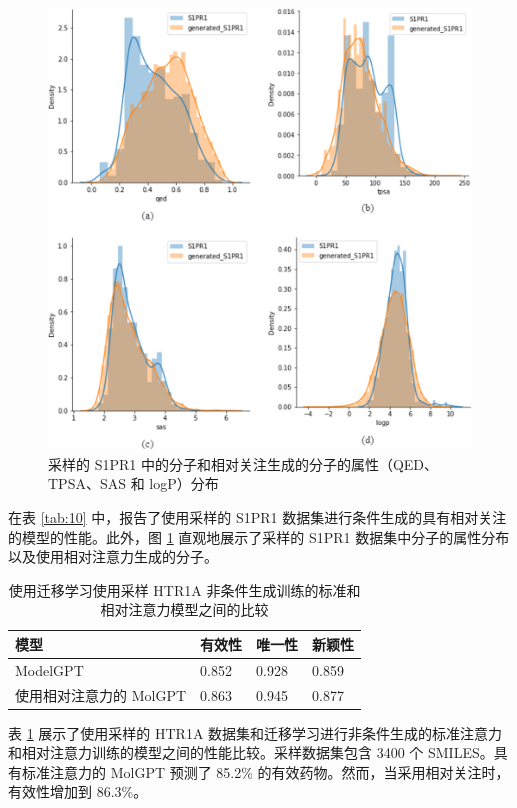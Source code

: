 \begin{translation}
\begin{figure}[H]
  \centering
  \includegraphics[width=\linewidth]{figures/7.png}
  \caption{采样的 S1PR1 中的分子和相对关注生成的分子的属性（QED、TPSA、SAS 和 logP）分布}
  \label{fig:7}
\end{figure}

在表 \ref{tab:10} 中，报告了使用采样的 S1PR1 数据集进行条件生成的具有相对关注的模型的性能。此外，图 \ref{fig:7} 直观地展示了采样的 S1PR1 数据集中分子的属性分布以及使用相对注意力生成的分子。

\begin{table}[H]
  \centering
  \caption{使用迁移学习使用采样 HTR1A 非条件生成训练的标准和相对注意力模型之间的比较}
  \label{tab:11}
  \begin{tabular}{llll}
    \hline 模型       & 有效性   & 唯一性   & 新颖性   \\
    \hline ModelGPT & 0.852 & 0.928 & 0.859 \\
    使用相对注意力的 MolGPT & 0.863 & 0.945 & 0.877 \\
    \hline
  \end{tabular}
\end{table}

表 \ref{tab:11} 展示了使用采样的 HTR1A 数据集和迁移学习进行非条件生成的标准注意力和相对注意力训练的模型之间的性能比较。采样数据集包含 3400 个 SMILES。具有标准注意力的 MolGPT 预测了 85.2\% 的有效药物。然而，当采用相对关注时，有效性增加到 86.3\%。


\end{translation}
